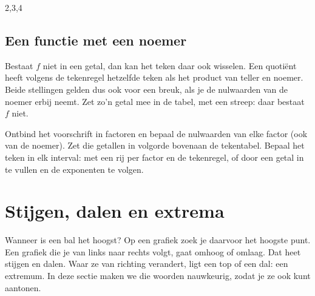 \begin{alleenvoor}{2,3,4}
\begin{oefeningen}
\end{oefeningen}

\subsection{Een functie met een noemer}

Bestaat $f$ niet in een getal, dan kan het teken daar ook wisselen. Een quotiënt heeft volgens de tekenregel hetzelfde teken als het product van teller en noemer. Beide stellingen gelden dus ook voor een breuk, als je de nulwaarden van de noemer erbij neemt. Zet zo'n getal mee in de tabel, met een streep: daar bestaat $f$ niet.


\begin{werkwijze}
Ontbind het voorschrift in factoren en bepaal de nulwaarden van elke factor (ook van de noemer). Zet die getallen in volgorde bovenaan de tekentabel. Bepaal het teken in elk interval: met een rij per factor en de tekenregel, of door een getal in te vullen en de exponenten te volgen.
\end{werkwijze}

\begin{oefeningen}
\end{oefeningen}

\end{alleenvoor}
\section{Stijgen, dalen en extrema}

Wanneer is een bal het hoogst? Op een grafiek zoek je daarvoor het hoogste punt. Een grafiek die je van links naar rechts volgt, gaat omhoog of omlaag. Dat heet stijgen en dalen. Waar ze van richting verandert, ligt een top of een dal: een extremum. In deze sectie maken we die woorden nauwkeurig, zodat je ze ook kunt aantonen.


